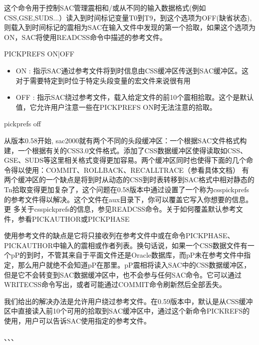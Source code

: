 \label{cmd:pickprefs}

这个命令用于控制SAC管理震相和/或从不同的输入数据格式(例如CSS,GSE,SUDS...）读入到时间标记变量T0到T9，到这个选项为OFF(缺省状态),则载入到时间标记的震相为SAC在输入文件中发现的第一个拾取，如果这个选项为ON，SAC将使用READCSS命令中描述的参考文件。

\begin{SACSTX}
PICKPREFS ON|OFF
\end{SACSTX}

\begin{itemize}
\item ON : 指示SAC通过参考文件将到时信息由CSS缓冲区传送到SAC缓冲区。这对于需要特定到时位于特定头段变量的宏文件来说很有用
\item OFF : 指示SAC绕过参考文件，载入给定文件的前10个震相拾取。这个是默认值，它允许用户注意一些在PICKPREFS ON时无法注意的拾取。 
\end{itemize}

\begin{SACDFT}
pickprefs off
\end{SACDFT}

从版本0.58开始, sac2000就有两个不同的头段缓冲区：一个根据SAC文件格式构建，一个根据有关的CSS3.0文件格式。添加了CSS数据缓冲区使得读取如CSS、GSE、SUDS等这里相关格式变得更加容易。两个缓冲区同时也使得下面的几个命令得以使用：COMMIT、ROLLBACK、RECALLTRACE（参看具体文档）
有两个缓冲区的一个缺点是将到时从动态的CSS到时表转移到SAC格式中相对静态的Tn拾取变得更加复杂了，这个问题在0.58版本中通过设置了一个称为csspickprefs	的参考文件得以解决。这个文件在aux目录下，你可以覆盖它写入你想要的信息。更	多关于csspickprefs的信息，参见READCSS命令。关于如何覆盖默认参考文件，参看PICKAUTHOR或PICKPHASE

使用参考文件的缺点是它将只接收列在参考文件中或在命令PICKPHASE、PICKAUTHOR中输入的震相或作者列表。换句话说，如果一个CSS数据文件有一个pP的到时，不管其来自于平面文件还是Oracle数据库，而pP未在参考文件中指定，那么用户就绝不会知道pP在那里。pP震相将读入SAC中的CSS数据缓冲区，但是它不会转变到SAC数据缓冲区中，也不会参与任何SAC命令。它可以通过WRITECSS命令写出，或者可能通过COMMIT命令刷新然后全部丢失。

我们给出的解决办法是允许用户绕过参考文件。在0.59版本中，默认是从CSS缓冲区中直接读入前10个可用的拾取到SAC缓冲区中，通过这个新命令PICKREFS的使用，用户可以告诉SAC使用指定的参考文件。

、、、
